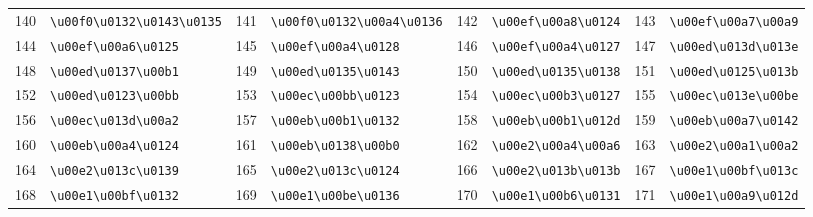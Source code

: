\begin{table}[!htbp]
\begin{tabular}{r l r l r l r l}
140 & \texttt{\textbackslash{}u00f0\textbackslash{}u0132\textbackslash{}u0143\textbackslash{}u0135} & 141 & \texttt{\textbackslash{}u00f0\textbackslash{}u0132\textbackslash{}u00a4\textbackslash{}u0136} & 142 & \texttt{\textbackslash{}u00ef\textbackslash{}u00a8\textbackslash{}u0124} & 143 & \texttt{\textbackslash{}u00ef\textbackslash{}u00a7\textbackslash{}u00a9} \\
144 & \texttt{\textbackslash{}u00ef\textbackslash{}u00a6\textbackslash{}u0125} & 145 & \texttt{\textbackslash{}u00ef\textbackslash{}u00a4\textbackslash{}u0128} & 146 & \texttt{\textbackslash{}u00ef\textbackslash{}u00a4\textbackslash{}u0127} & 147 & \texttt{\textbackslash{}u00ed\textbackslash{}u013d\textbackslash{}u013e} \\
148 & \texttt{\textbackslash{}u00ed\textbackslash{}u0137\textbackslash{}u00b1} & 149 & \texttt{\textbackslash{}u00ed\textbackslash{}u0135\textbackslash{}u0143} & 150 & \texttt{\textbackslash{}u00ed\textbackslash{}u0135\textbackslash{}u0138} & 151 & \texttt{\textbackslash{}u00ed\textbackslash{}u0125\textbackslash{}u013b} \\
152 & \texttt{\textbackslash{}u00ed\textbackslash{}u0123\textbackslash{}u00bb} & 153 & \texttt{\textbackslash{}u00ec\textbackslash{}u00bb\textbackslash{}u0123} & 154 & \texttt{\textbackslash{}u00ec\textbackslash{}u00b3\textbackslash{}u0127} & 155 & \texttt{\textbackslash{}u00ec\textbackslash{}u013e\textbackslash{}u00be} \\
156 & \texttt{\textbackslash{}u00ec\textbackslash{}u013d\textbackslash{}u00a2} & 157 & \texttt{\textbackslash{}u00eb\textbackslash{}u00b1\textbackslash{}u0132} & 158 & \texttt{\textbackslash{}u00eb\textbackslash{}u00b1\textbackslash{}u012d} & 159 & \texttt{\textbackslash{}u00eb\textbackslash{}u00a7\textbackslash{}u0142} \\
160 & \texttt{\textbackslash{}u00eb\textbackslash{}u00a4\textbackslash{}u0124} & 161 & \texttt{\textbackslash{}u00eb\textbackslash{}u0138\textbackslash{}u00b0} & 162 & \texttt{\textbackslash{}u00e2\textbackslash{}u00a4\textbackslash{}u00a6} & 163 & \texttt{\textbackslash{}u00e2\textbackslash{}u00a1\textbackslash{}u00a2} \\
164 & \texttt{\textbackslash{}u00e2\textbackslash{}u013c\textbackslash{}u0139} & 165 & \texttt{\textbackslash{}u00e2\textbackslash{}u013c\textbackslash{}u0124} & 166 & \texttt{\textbackslash{}u00e2\textbackslash{}u013b\textbackslash{}u013b} & 167 & \texttt{\textbackslash{}u00e1\textbackslash{}u00bf\textbackslash{}u013c} \\
168 & \texttt{\textbackslash{}u00e1\textbackslash{}u00bf\textbackslash{}u0132} & 169 & \texttt{\textbackslash{}u00e1\textbackslash{}u00be\textbackslash{}u0136} & 170 & \texttt{\textbackslash{}u00e1\textbackslash{}u00b6\textbackslash{}u0131} & 171 & \texttt{\textbackslash{}u00e1\textbackslash{}u00a9\textbackslash{}u012d} \\

\end{tabular}
\end{table}
